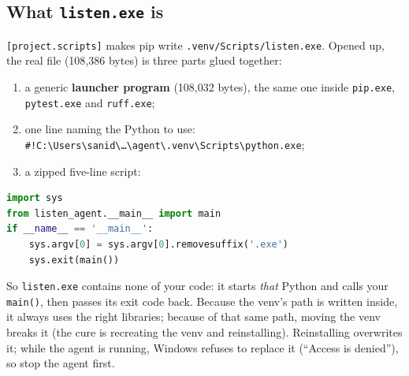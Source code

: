 \documentclass[11pt,a4paper]{article}
\begin{document}
\subsection{What \texttt{listen.exe} is}
\texttt{[project.scripts]} makes pip write \texttt{.venv/Scripts/listen.exe}. Opened up, the real
file (108{,}386 bytes) is three parts glued together:
\begin{enumerate}[nosep]
  \item a generic \textbf{launcher program} (108{,}032 bytes), the same one inside
        \texttt{pip.exe}, \texttt{pytest.exe} and \texttt{ruff.exe};
  \item one line naming the Python to use:\\
        \texttt{\#!C:\textbackslash Users\textbackslash sanid\textbackslash \ldots\textbackslash agent\textbackslash .venv\textbackslash Scripts\textbackslash python.exe};
  \item a zipped five-line script:
\end{enumerate}
\begin{lstlisting}[language=Python]
import sys
from listen_agent.__main__ import main
if __name__ == '__main__':
    sys.argv[0] = sys.argv[0].removesuffix('.exe')
    sys.exit(main())
\end{lstlisting}
\noindent So \texttt{listen.exe} contains none of your code: it starts \emph{that} Python and calls
your \texttt{main()}, then passes its exit code back. Because the venv's path is written inside,
it always uses the right libraries; because of that same path, moving the venv breaks it (the cure
is recreating the venv and reinstalling). Reinstalling overwrites it; while the agent is running,
Windows refuses to replace it (``Access is denied''), so stop the agent first.
\end{document}
